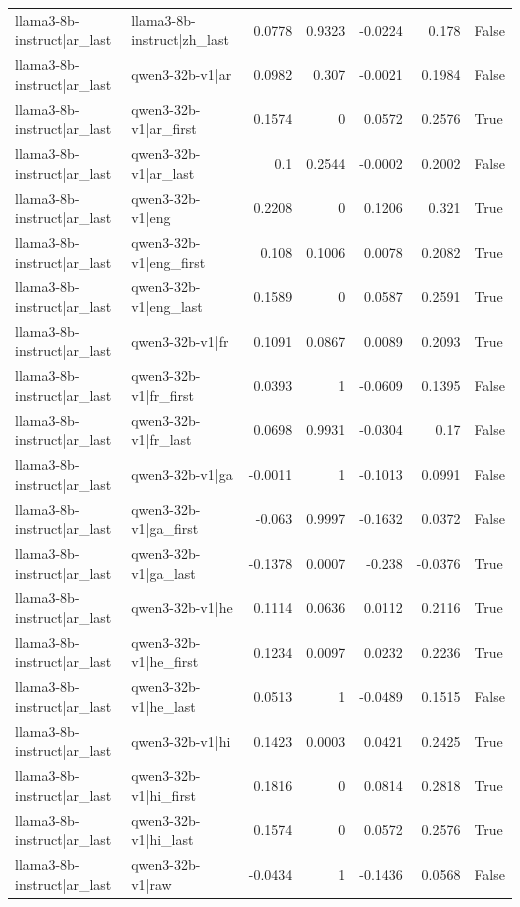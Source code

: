 \begin{table}
\begin{tabular}{l l r r r r l}
llama3-8b-instruct|ar_last & llama3-8b-instruct|zh_last & 0.0778 & 0.9323 & -0.0224 & 0.178 & False \\
llama3-8b-instruct|ar_last & qwen3-32b-v1|ar & 0.0982 & 0.307 & -0.0021 & 0.1984 & False \\
llama3-8b-instruct|ar_last & qwen3-32b-v1|ar_first & 0.1574 & 0 & 0.0572 & 0.2576 & True \\
llama3-8b-instruct|ar_last & qwen3-32b-v1|ar_last & 0.1 & 0.2544 & -0.0002 & 0.2002 & False \\
llama3-8b-instruct|ar_last & qwen3-32b-v1|eng & 0.2208 & 0 & 0.1206 & 0.321 & True \\
llama3-8b-instruct|ar_last & qwen3-32b-v1|eng_first & 0.108 & 0.1006 & 0.0078 & 0.2082 & True \\
llama3-8b-instruct|ar_last & qwen3-32b-v1|eng_last & 0.1589 & 0 & 0.0587 & 0.2591 & True \\
llama3-8b-instruct|ar_last & qwen3-32b-v1|fr & 0.1091 & 0.0867 & 0.0089 & 0.2093 & True \\
llama3-8b-instruct|ar_last & qwen3-32b-v1|fr_first & 0.0393 & 1 & -0.0609 & 0.1395 & False \\
llama3-8b-instruct|ar_last & qwen3-32b-v1|fr_last & 0.0698 & 0.9931 & -0.0304 & 0.17 & False \\
llama3-8b-instruct|ar_last & qwen3-32b-v1|ga & -0.0011 & 1 & -0.1013 & 0.0991 & False \\
llama3-8b-instruct|ar_last & qwen3-32b-v1|ga_first & -0.063 & 0.9997 & -0.1632 & 0.0372 & False \\
llama3-8b-instruct|ar_last & qwen3-32b-v1|ga_last & -0.1378 & 0.0007 & -0.238 & -0.0376 & True \\
llama3-8b-instruct|ar_last & qwen3-32b-v1|he & 0.1114 & 0.0636 & 0.0112 & 0.2116 & True \\
llama3-8b-instruct|ar_last & qwen3-32b-v1|he_first & 0.1234 & 0.0097 & 0.0232 & 0.2236 & True \\
llama3-8b-instruct|ar_last & qwen3-32b-v1|he_last & 0.0513 & 1 & -0.0489 & 0.1515 & False \\
llama3-8b-instruct|ar_last & qwen3-32b-v1|hi & 0.1423 & 0.0003 & 0.0421 & 0.2425 & True \\
llama3-8b-instruct|ar_last & qwen3-32b-v1|hi_first & 0.1816 & 0 & 0.0814 & 0.2818 & True \\
llama3-8b-instruct|ar_last & qwen3-32b-v1|hi_last & 0.1574 & 0 & 0.0572 & 0.2576 & True \\
llama3-8b-instruct|ar_last & qwen3-32b-v1|raw & -0.0434 & 1 & -0.1436 & 0.0568 & False \\

\end{tabular}
\end{table}
